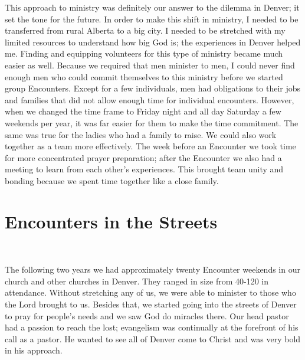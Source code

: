 \documentclass[twoside, 12pt]{book}
\begin{document}
This approach to ministry was definitely our answer to the dilemma in Denver; it set the tone for the future. In order to make this shift in ministry, I needed to be transferred from rural Alberta to a big city. I needed to be stretched with my limited resources to understand how big God is; the experiences in Denver helped me. Finding and equipping volunteers for this type of ministry became much easier as well. Because we required that men minister to men, I could never find enough men who could commit themselves to this ministry before we started group Encounters. Except for a few individuals, men had obligations to their jobs and families that did not allow enough time for individual encounters. However, when we changed the time frame to Friday night and all day Saturday a few weekends per year, it was far easier for them to make the time commitment. The same was true for the ladies who had a family to raise. We could also work together as a team more effectively. The week before an Encounter we took time for more concentrated prayer preparation; after the Encounter we also had a meeting to learn from each other’s experiences. This brought team unity and bonding because we spent time together like a close family. 


\section{Encounters in the Streets}
\

The following two years we had approximately twenty Encounter weekends in our church and other churches in Denver. They ranged in size from 40-120 in attendance. Without stretching any of us, we were able to minister to those who the Lord brought to us. Besides that, we started going into the streets of Denver to pray for people’s needs and we saw God do miracles there. Our head pastor had a passion to reach the lost; evangelism was continually at the forefront of his call as a pastor. He wanted to see all of Denver come to Christ and was very bold in his approach. 
\end{document}
